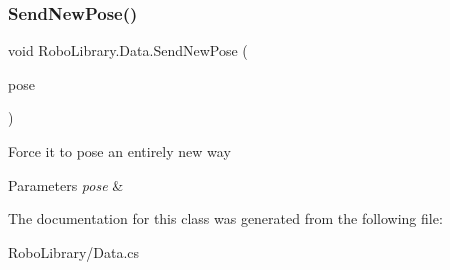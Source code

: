 \subsubsection{\texorpdfstring{Send\+New\+Pose()}{SendNewPose()}}
{\footnotesize\ttfamily void Robo\+Library.\+Data.\+Send\+New\+Pose (\begin{DoxyParamCaption}\item[{\hyperlink{class_robo_library_1_1_u_r_pose}{U\+R\+Pose}}]{pose }\end{DoxyParamCaption})}



Force it to pose an entirely new way 


\begin{DoxyParams}{Parameters}
{\em pose} & \\
\hline
\end{DoxyParams}


The documentation for this class was generated from the following file\+:\begin{DoxyCompactItemize}
\item 
Robo\+Library/Data.\+cs\end{DoxyCompactItemize}
